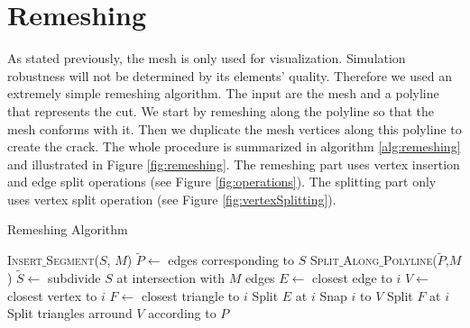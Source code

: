 \section{Remeshing} \label{appendix:remeshing}

As stated previously, the mesh is only used for visualization. Simulation robustness will not be determined by its elements' quality. Therefore we used an extremely simple remeshing algorithm. The input are the mesh and a polyline that represents the cut. We start by remeshing along the polyline so that the mesh  conforms with it. Then we duplicate the mesh vertices along this polyline to create the crack. The whole procedure is summarized in algorithm \ref{alg:remeshing} and illustrated in Figure \ref{fig:remeshing}. The remeshing part uses vertex insertion and edge split operations (see Figure \ref{fig:operations}). The splitting part only uses vertex split operation (see Figure \ref{fig:vertexSplitting}).

\begin{algorithm}[hp]
\caption[Frame-based cutting: Remeshing algorithm]{\label{alg:remeshing}Remeshing Algorithm}
\begin{algorithmic}[1]
\State \textsc{Insert$\_$Segment}($S$, $M$)
\State $\tilde{P} \gets$ edges corresponding to $S$
\State \textsc{Split$\_$Along$\_$Polyline}($\tilde{P}$,$M$)
\EndProcedure
\State
{}
\State $\tilde{S} \gets$ subdivide $S$ at intersection with $M$ edges
\State $E \gets$ closest edge to $i$
\State $V \gets$ closest vertex to $i$
\State $F \gets$ closest triangle to $i$
\State Split $E$ at $i$
\State Snap $i$ to $V$
\Else
\State Split $F$ at $i$
\EndIf
\EndFor
\EndProcedure
\State
{}
\State Split triangles arround $V$ according to $P$
\EndFor
\EndProcedure
\end{algorithmic}
\end{algorithm}

\clearpage 

